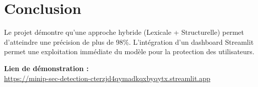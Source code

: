 \documentclass[12pt,a4paper]{article}
\begin{document}
\section{Conclusion}
Le projet démontre qu'une approche hybride (Lexicale + Structurelle) permet d'atteindre une précision de plus de 98\%. L'intégration d'un dashboard Streamlit permet une exploitation immédiate du modèle pour la protection des utilisateurs.

\vspace{1cm}
\textbf{Lien de démonstration :} \\
\url{https://minip-sec-detection-cterzjd4qymadkqxbyqytx.streamlit.app}
\end{document}
